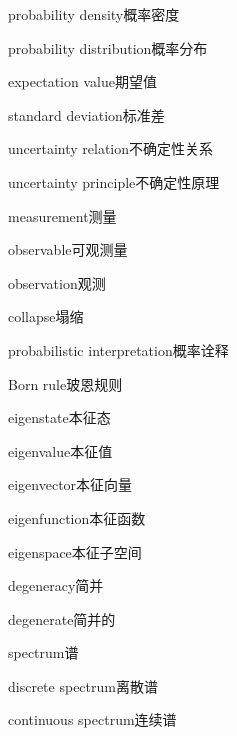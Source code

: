 \begin{multicols}{2}
probability density\hspace{0.9em}概率密度\par
probability distribution\hspace{0.9em}概率分布\par
expectation value\hspace{0.9em}期望值\par
standard deviation\hspace{0.9em}标准差\par
uncertainty relation\hspace{0.9em}不确定性关系\par
uncertainty principle\hspace{0.9em}不确定性原理\par
measurement\hspace{0.9em}测量\par
observable\hspace{0.9em}可观测量\par
observation\hspace{0.9em}观测\par
collapse\hspace{0.9em}塌缩\par
probabilistic interpretation\hspace{0.9em}概率诠释\par
Born rule\hspace{0.9em}玻恩规则\par
eigenstate\hspace{0.9em}本征态\par
eigenvalue\hspace{0.9em}本征值\par
eigenvector\hspace{0.9em}本征向量\par
eigenfunction\hspace{0.9em}本征函数\par
eigenspace\hspace{0.9em}本征子空间\par
degeneracy\hspace{0.9em}简并\par
degenerate\hspace{0.9em}简并的\par
spectrum\hspace{0.9em}谱\par
discrete spectrum\hspace{0.9em}离散谱\par
continuous spectrum\hspace{0.9em}连续谱\par

\end{multicols}
